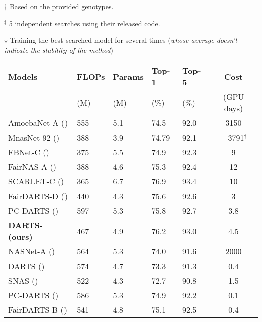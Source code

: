 \documentclass{article} \usepackage{iclr2021_conference,times}
\newcommand{\citeyp}[1]{(\citeyear{#1})}
\begin{document}
\begin{table}[tb!]
\begin{center}
\begin{scriptsize}
\begin{minipage}{0.48\textwidth}
\begin{threeparttable}
\begin{tabular}{*{5}{l}}
				\bottomrule
			\end{tabular}
			\begin{tablenotes}
			\footnotesize
			\item[$\dagger$] Based on the provided genotypes.
			\item[$^\ddagger$] 5 independent searches using their released code.
			\item[$\star$]Training the best searched model for several times (\emph{whose average doesn't indicate the stability of the method})
			\end{tablenotes}
			\end{threeparttable}
			\end{minipage}
			\begin{minipage}{0.5\textwidth}
			\vspace{-2pt}
			\begin{threeparttable}
			\begin{tabular}{*{2}{l}*{3}{l}c} 			
				\toprule
				\textbf{Models} & \textbf{FLOPs}  & \textbf{Params} & \textbf{Top-1} & \textbf{Top-5}  & \textbf{Cost} \\
				& \scriptsize{(M)} & \scriptsize{(M)} & \scriptsize{(\%)} & \scriptsize{(\%)} & \scriptsize{(GPU days)}  \\
\midrule
				AmoebaNet-A \citeyp{real2019regularized} & 555  & 5.1 & 74.5& 92.0& 3150 \\
				MnasNet-92 \citeyp{tan2018mnasnet}  & 388 & 3.9 & 74.79  &92.1& \ \ 3791$^\ddagger$ \\ 	
				FBNet-C \citeyp{wu2018fbnet}   & 375 & 5.5 &  74.9 & 92.3& 9 \\ 
				FairNAS-A \citeyp{chu2019fairnas} &388 & 4.6 & 75.3 & 92.4 & 12 \\
				SCARLET-C \citeyp{chu2019scarletnas}  & 365 & 6.7 & 76.9 & 93.4 & 10 \\
				FairDARTS-D \citeyp{chu2019fair} & 440 & 4.3 & 75.6& 92.6&3 \\
				PC-DARTS \citeyp{xu2020pcdarts} & 597 & 5.3 & 75.8 & 92.7 & 3.8 \\
				\textbf{DARTS- (ours) }& 467 & 4.9 & 76.2 & 93.0 & 4.5\\
\midrule
				NASNet-A \citeyp{zoph2017learning}  & 564 & 5.3 &74.0 & 91.6& 2000 \\
DARTS \citeyp{liu2018darts} & 574 & 4.7 & 73.3 & 91.3 &0.4 \\
				SNAS \citeyp{xie2018snas}  &522&4.3&72.7 & 90.8&1.5 \\
PC-DARTS  \citeyp{xu2020pcdarts} & 586 & 5.3 & 74.9 & 92.2 &0.1 \\ 
				FairDARTS-B \citeyp{chu2019fair}& 541 & 4.8 &75.1 & 92.5 & 0.4 \\
				


\end{tabular}
\end{threeparttable}
\end{minipage}
\end{scriptsize}
\end{center}
\end{table}
\end{document}
